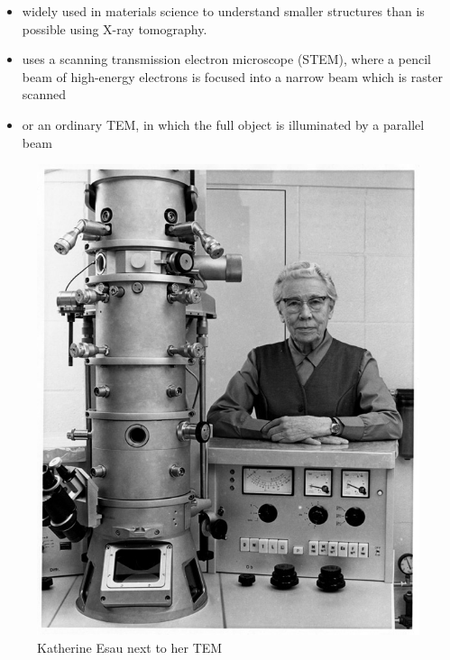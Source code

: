 \documentclass{beamer}
\begin{document}
	 \begin{frame}
		 \begin{itemize}
			\item widely used in materials science to understand smaller structures than is possible using X-ray tomography. 
			\item uses a scanning transmission electron microscope (STEM), where a pencil beam of high-energy electrons is focused into a narrow beam which is raster scanned
			\item or an ordinary TEM, in which the full object is illuminated by a parallel beam
	\end{itemize}
		 \center 
		 \pause
\begin{figure}
  \includegraphics[scale=0.15]{media/Esau_at_TEM.jpg}
  \caption{Katherine Esau next to her TEM}
\end{figure}


\end{frame}
\end{document}
